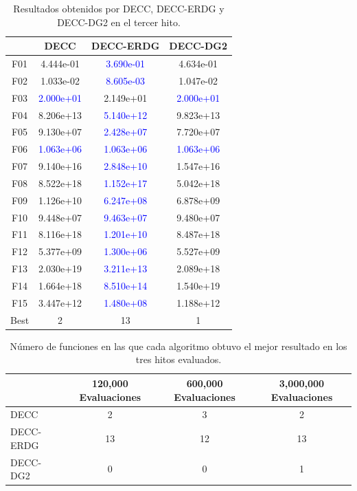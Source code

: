 \begin{table}[h]
\centering
\begin{tabular}{cccc}
\toprule
{} &       DECC &  DECC-ERDG &   DECC-DG2 \\
\midrule
F01  &  4.444e-01 &  \textcolor{blue}{3.690e-01} &  4.634e-01 \\
F02  &  1.033e-02 &  \textcolor{blue}{8.605e-03} &  1.047e-02 \\
F03  &  \textcolor{blue}{2.000e+01} &  2.149e+01 &  \textcolor{blue}{2.000e+01} \\
F04  &  8.206e+13 &  \textcolor{blue}{5.140e+12} &  9.823e+13 \\
F05  &  9.130e+07 &  \textcolor{blue}{2.428e+07} &  7.720e+07 \\
F06  &  \textcolor{blue}{1.063e+06} &  \textcolor{blue}{1.063e+06} &  \textcolor{blue}{1.063e+06} \\
F07  &  9.140e+16 &  \textcolor{blue}{2.848e+10} &  1.547e+16 \\
F08  &  8.522e+18 &  \textcolor{blue}{1.152e+17} &  5.042e+18 \\
F09  &  1.126e+10 &  \textcolor{blue}{6.247e+08} &  6.878e+09 \\
F10  &  9.448e+07 &  \textcolor{blue}{9.463e+07} &  9.480e+07 \\
F11  &  8.116e+18 &  \textcolor{blue}{1.201e+10} &  8.487e+18 \\
F12  &  5.377e+09 &  \textcolor{blue}{1.300e+06} &  5.527e+09 \\
F13  &  2.030e+19 &  \textcolor{blue}{3.211e+13} &  2.089e+18 \\
F14  &  1.664e+18 &  \textcolor{blue}{8.510e+14} &  1.540e+19 \\
F15  &  3.447e+12 &  \textcolor{blue}{1.480e+08} &  1.188e+12 \\
Best &          2 &         13 &          1 \\
\bottomrule
\end{tabular}
\caption{Resultados obtenidos por DECC, DECC-ERDG y DECC-DG2 en el tercer hito.}
\label{tab:resultados_DECC_3}
\end{table}

\begin{table}[h]
\centering
\begin{tabular}{lccc}
\toprule
{} & \textbf{120,000 Evaluaciones} & \textbf{600,000 Evaluaciones} & \textbf{3,000,000 Evaluaciones} \\
\midrule
DECC      &  2 &  3 &  2 \\
DECC-ERDG &  13 &  12 &  13 \\
DECC-DG2  &  0 &  0 &  1 \\
\bottomrule
\end{tabular}
\caption{Número de funciones en las que cada algoritmo obtuvo el mejor resultado en los tres hitos evaluados.}
\label{tab:resultados_comparativos_hitos}
\end{table}

